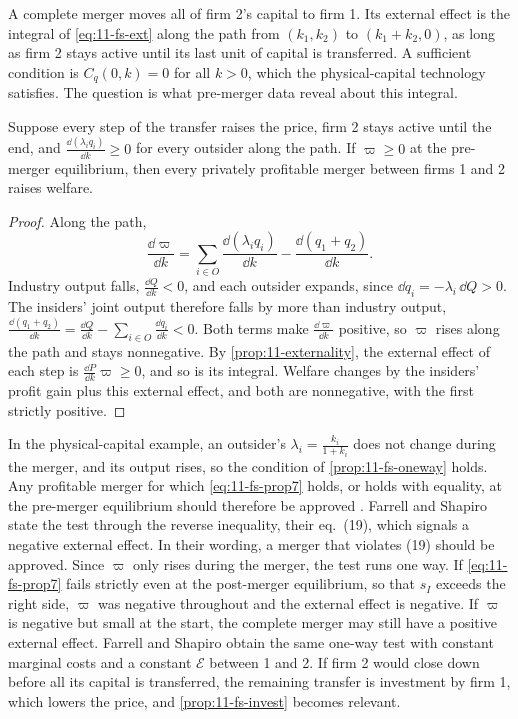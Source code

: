 A complete merger moves all of firm 2's capital to firm 1. Its external effect is the integral of
\eqref{eq:11-fs-ext} along the path from $(k_1, k_2)$ to $(k_1 + k_2, 0)$, as long as firm 2 stays active until its
last unit of capital is transferred. A sufficient condition is $C_q(0, k) = 0$ for all $k > 0$, which the
physical-capital technology satisfies. The question is what pre-merger data reveal about this integral.

\begin{proposition}\label{prop:11-fs-oneway}
Suppose every step of the transfer raises the price, firm 2 stays active until the end, and
$\frac{\dd(\lambda_i q_i)}{\dd k} \ge 0$ for every outsider along the path. If $\varpi \ge 0$ at the pre-merger
equilibrium, then every privately profitable merger between firms 1 and 2 raises welfare.
\end{proposition}

\begin{proof}
Along the path,
\begin{equation*}
\frac{\dd\varpi}{\dd k} = \sum_{i \in O}\frac{\dd(\lambda_i q_i)}{\dd k} - \frac{\dd(q_1 + q_2)}{\dd k} .
\end{equation*}
Industry output falls, $\frac{\dd Q}{\dd k} < 0$, and each outsider expands, since
$\dd q_i = -\lambda_i\,\dd Q > 0$. The insiders' joint output therefore falls by more than industry output,
$\frac{\dd(q_1 + q_2)}{\dd k} = \frac{\dd Q}{\dd k} - \sum_{i \in O}\frac{\dd q_i}{\dd k} < 0$. Both terms make
$\frac{\dd\varpi}{\dd k}$ positive, so $\varpi$ rises along the path and stays nonnegative. By
\cref{prop:11-externality}, the external effect of each step is $\frac{\dd P}{\dd k}\varpi \ge 0$, and so is its
integral. Welfare changes by the insiders' profit gain plus this external effect, and both are nonnegative, with
the first strictly positive.
\end{proof}

In the physical-capital example, an outsider's $\lambda_i = \frac{k_i}{1 + k_i}$ does not change during the merger,
and its output rises, so the condition of \cref{prop:11-fs-oneway} holds. Any profitable merger for which
\eqref{eq:11-fs-prop7} holds, or holds with equality, at the pre-merger equilibrium should therefore be approved
\citep[p.~24]{FarrellShapiro1988}. Farrell and Shapiro state the test through the reverse inequality, their
eq.~(19), which signals a negative external effect. In their wording, a merger that violates (19) should be approved.
Since $\varpi$ only rises during the merger, the test runs one way. If \eqref{eq:11-fs-prop7} fails strictly even at
the post-merger equilibrium, so that $s_I$ exceeds the right side, $\varpi$ was negative throughout and the external
effect is negative. If $\varpi$ is negative but small at the start, the complete merger may still have a positive
external effect. Farrell and Shapiro obtain the same one-way test with constant marginal costs and a constant
$\mathcal{E}$ between 1 and 2. If firm 2 would close down before all its capital is transferred, the remaining
transfer is investment by firm 1, which lowers the price, and \cref{prop:11-fs-invest} becomes relevant.

